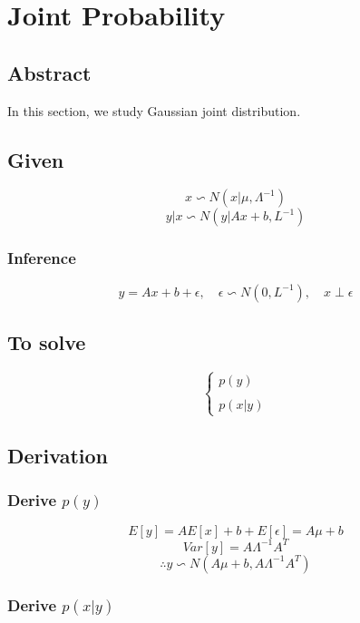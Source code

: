 \documentclass{report}
\begin{document}
\chapter{Joint Probability}
\section{Abstract}
In this section, we study Gaussian joint distribution.
\section{Given}
$$
x \backsim N(x|\mu, \Lambda^{-1})
$$
$$
y|x \backsim N(y|Ax+b, L^{-1})
$$
\subsection{Inference}
$$
y = Ax+b+\epsilon, \quad \epsilon \backsim N(0, L^{-1}), \quad x \perp \epsilon
$$
\section{To solve}
$$
\begin{cases}
p(y)\\
\\
p(x|y)
\end{cases}
$$
\section{Derivation}
\subsection{Derive $p(y)$}

$$
E[y] = A E[x] + b + E[\epsilon]=A \mu + b
$$
$$
Var[y] = A \Lambda^{-1} A^T
$$
$$
\therefore y \backsim N(A\mu +b, A\Lambda^{-1} A^T)
$$
\subsection{Derive $p(x|y)$}
\end{document}
